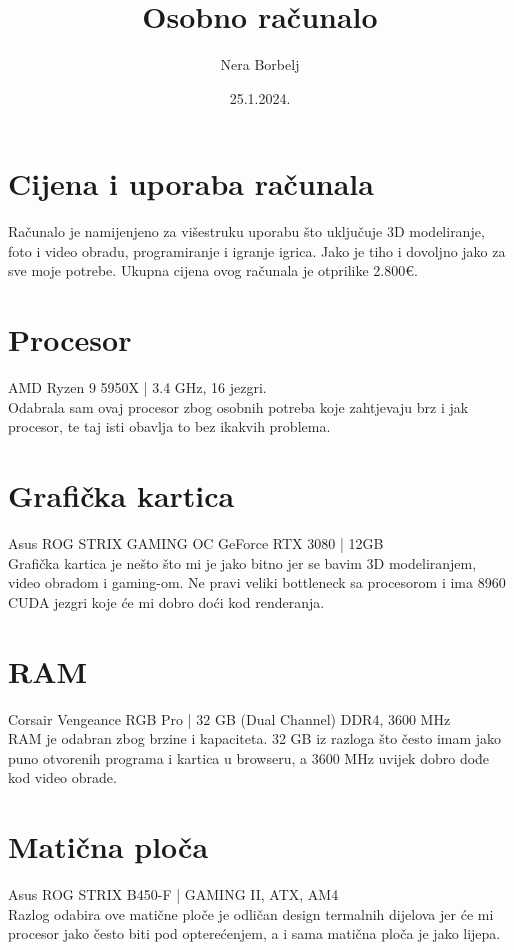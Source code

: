 \documentclass{report}
\begin{document}
\title{Osobno računalo}
\author{Nera Borbelj}
\date{25.1.2024.}
\maketitle
\tableofcontents
\listoffigures

\chapter{Cijena i uporaba računala}
Računalo je namijenjeno za višestruku uporabu što uključuje 3D modeliranje, foto i video obradu, programiranje i igranje igrica. Jako je tiho i dovoljno jako za sve moje potrebe. Ukupna cijena ovog računala je otprilike 2.800€.
 
\chapter{Procesor}
AMD Ryzen 9 5950X | 3.4 GHz, 16 jezgri.
\\ Odabrala sam ovaj procesor zbog osobnih potreba koje zahtjevaju brz i jak procesor, te taj isti obavlja to bez ikakvih problema.

\chapter{Grafička kartica}
Asus ROG STRIX GAMING OC GeForce RTX 3080 | 12GB
\\ Grafička kartica je nešto što mi je jako bitno jer se bavim 3D modeliranjem, video obradom i gaming-om. Ne pravi veliki bottleneck sa procesorom i ima 8960 CUDA jezgri koje će mi dobro doći kod renderanja.

\chapter{RAM}
Corsair Vengeance RGB Pro | 32 GB (Dual Channel) DDR4, 3600 MHz
\\ RAM je odabran zbog brzine i kapaciteta. 32 GB iz razloga što često imam jako puno otvorenih programa i kartica u browseru, a 3600 MHz uvijek dobro dođe kod video obrade.

\chapter{Matična ploča}
Asus ROG STRIX B450-F | GAMING II, ATX, AM4
\\ Razlog odabira ove matične ploče je odličan design termalnih dijelova jer će mi procesor jako često biti pod opterećenjem, a i sama matična ploča je jako lijepa.
\end{document}
